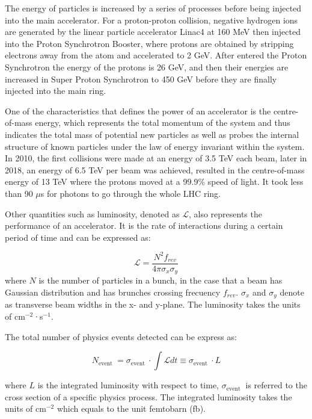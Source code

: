 \documentclass[UTF8,12pt]{ctexart}
\numberwithin{equation}{section}
\begin{document}
 The energy of particles is increased by a series of processes before being injected into the main accelerator. For a proton-proton collision, negative hydrogen ions are generated by the linear particle accelerator Linac4 at 160 MeV then injected into the Proton Synchrotron Booster, where protons are obtained by stripping electrons away from the atom and accelerated to 2 GeV. After entered the Proton Synchrotron the energy of the protons is 26 GeV, and then their energies are increased in Super Proton Synchrotron to 450 GeV before they are finally injected into the main ring. 

  
One of the characteristics that defines the power of an accelerator is the centre-of-mass energy, which represents the total momentum of the system and thus indicates the total mass of potential new particles as well as probes the internal structure of known particles under the law of energy invariant within the system. In 2010, the first collisions were made at an energy of 3.5 TeV each beam, later in 2018, an energy of 6.5 TeV per beam was achieved, resulted in the centre-of-mass energy of 13 TeV where the protons moved at a 99.9\% speed of light. It took less than 90 $\mu$s for photons to go through the whole LHC ring. 

Other quantities such as luminosity, denoted as $\mathcal{L}$, also represents the performance of an accelerator. It is the rate of interactions during a certain period of time and can be expressed as:

\begin{equation}
\mathcal{L}=\frac{N^2 f_{r e v}}{4 \pi \sigma_x \sigma_y} 
\end{equation}
where $N$ is the number of particles in a bunch, in the case that a beam has Gaussian distribution and has brunches crossing frecuency $f_{rev}$. $\sigma_x$ and $\sigma_y$ denote as transverse beam widths in the x- and y-plane. The luminosity takes the units of cm$^{-2}$·s$^{-1}$.

The total number of physics events detected can be express as:

\begin{equation}
N_{\text {event }}=\sigma_{\text {event }} \cdot \int \mathcal{L} d t \equiv \sigma_{\text {event }} \cdot L
\end{equation}

where $L$ is the integrated luminosity with respect to time, $\sigma_{\text {event }}$ is referred to the cross section of a specific physics process. The integrated luminosity takes the units of cm$^{-2}$ which equals to the unit femtobarn (fb).
\end{document}
